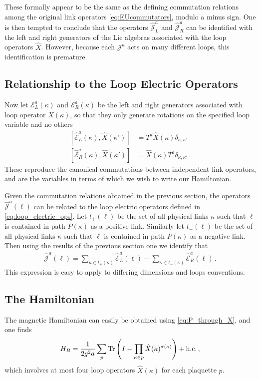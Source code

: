 \documentclass[reprint,superscriptaddress,pra,nofootinbib,preprintnumbers,floatfix]{revtex4-1}
\begin{document}
These formally appear to be the same as the defining commutation relations among the original link operators \cref{eq:EUcommutators}, modulo a minus sign. One is then tempted to conclude that the operators $\hat{\mathcal{J}}_L^a$ and $\hat{\mathcal{J}}_R^a$ can be identified with the left and right generators of the Lie algebras associated with the loop operators $\hat X$. However, because each $\mathcal{J}^a$ acts  on many different loops, this identification is premature.

\subsection{Relationship to the Loop Electric Operators}
Now let $\mathcal{E}^a_L(\kappa)$ and $\mathcal{E}^a_R(\kappa)$ be the left and right generators associated with loop operator $X(\kappa)$, so that they only generate rotations on the specified loop variable and no others
%
\begin{align}\label{eq:loop_electric_ops}
    [\hat{\mathcal{E}}_L^a(\kappa), \hat X(\kappa')] &= T^a \hat X(\kappa) \delta_{\kappa,\kappa'} \\[10pt]
    [ \hat{\mathcal{E}}_R^a(\kappa), \hat X(\kappa')] &= \hat X(\kappa) T^a \delta_{\kappa,\kappa'}
    \,.
\end{align}
%
These reproduce the canonical commutations between independent link operators, and are the variables in terms of which we wish to write our Hamiltonian.

Given the commutation relations obtained in the previous section, the operators $\hat{\mathcal{J}}^a(\ell)$ can be related to the loop electric operators defined in \cref{eq:loop_electric_ops}. 
%
Let $t_{+}(\ell)$ be the set of all physical links $\kappa$ such that $\ell$ is contained in path $P(\kappa)$ as a positive link. 
%
Similarly let $t_{-}(\ell)$ be the set of all physical links $\kappa$ such that $\ell$ is contained in path $P(\kappa)$ as a negative link. 
%
Then using the results of the previous section one we identify that
%
\begin{align}
\label{eq:Ja_relation}
    \hat{\mathcal{J}}^a(\ell) = \sum_{\kappa \in t_+(\kappa)} \hat{\mathcal{E}}^a_{L}(\ell) - \sum_{\kappa \in t_{-}(\kappa)} \hat{\mathcal{E}}^{a}_{R}(\ell)
    \,.
\end{align}
%
This expression is easy to apply to differing dimensions and loops conventions. 

\subsection{The Hamiltonian}
The magnetic Hamiltonian can easily be obtained using \cref{eq:P_through_X}, and one finds
%
\begin{align}
\label{eq:HB_maxTree}
    H_B = \frac{1}{2g^2 a}\sum_p \Tr \left( I - \prod_{\kappa\in p} \hat X(\kappa)^{\sigma(\kappa)} \right) + \mathrm{h.c.}
    \,,
\end{align}
%
which involves at most four loop operators $\hat X(\kappa)$ for each plaquette $p$.
\end{document}
